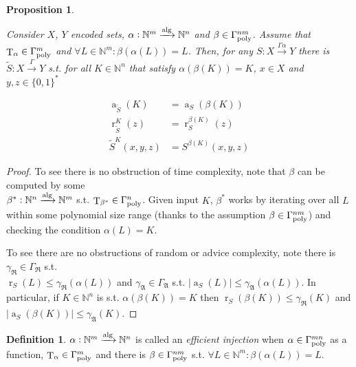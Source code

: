 \documentclass{article}
\numberwithin{equation}{section}
\theoremstyle{definition}
\newtheorem{definition}{Definition}[section]
\theoremstyle{plain}
\newtheorem{proposition}{Proposition}[section]
\newcommand{\Bool}{\{0,1\}}
\newcommand{\Words}{{\Bool^*}}
\DeclareMathOperator{\T}{T}
\DeclareMathOperator{\R}{r}
\DeclareMathOperator{\A}{a}
\newcommand{\Nats}{\mathbb{N}}
\newcommand{\Abs}[1]{\lvert #1 \rvert}
\newcommand{\GrowR}{\Gamma_{\mathfrak{R}}}
\newcommand{\GrowA}{\Gamma_{\mathfrak{A}}}
\newcommand{\GammaPoly}{\Gamma_{\textnormal{poly}}}
\newcommand{\Alg}{\xrightarrow{\textnormal{alg}}}
\newcommand{\Scheme}{\xrightarrow{\Gamma}}
\begin{document}
\begin{samepage}
\begin{proposition}
\label{prp:rev_sch_idx}

Consider  ${X}$, ${Y}$ encoded sets, ${\alpha: \Nats^m \Alg \Nats^n}$ and ${\beta \in \GammaPoly^{nm}}$. Assume that ${\T_\alpha \in \GammaPoly^m}$ and ${\forall L \in \Nats^m: \beta(\alpha(L))=L}$. Then, for any  ${S: X \xrightarrow{\Gamma \alpha} Y}$ there is ${\tilde{S}: X \Scheme Y}$ s.t. for all ${K \in \Nats^n}$ that satisfy ${\alpha(\beta(K))=K}$, ${x \in X}$ and ${y,z \in \Words}$

\begin{align}
\A_{\tilde{S}}(K)&=\A_S(\beta(K)) \\
\R_{\tilde{S}}^K(z)&=\R_S^{\beta(K)}(z) \\
\tilde{S}^K(x,y,z)&=S^{\beta(K)}(x,y,z)
\end{align}

\end{proposition}
\end{samepage}

\begin{proof}

To see there is no obstruction of time complexity, note that ${\beta}$ can be computed by some\\ ${\beta^*: \Nats^n \Alg \Nats^m}$ s.t. ${\T_{\beta^*} \in \GammaPoly^n}$. Given input ${K}$, ${\beta^*}$ works by iterating over all ${L}$ within some polynomial size range (thanks to the assumption ${\beta \in \GammaPoly^{nm}}$) and checking the condition ${\alpha(L)=K}$.

To see there are no obstructions of random or advice complexity, note there is ${\gamma_{\mathfrak{R}} \in \GrowR}$ s.t.\\ $\R_S(L) \leq \gamma_{\mathfrak{R}}(\alpha(L))$ and ${\gamma_{\mathfrak{A}} \in \GrowA}$ s.t. ${\Abs{\A_S(L)} \leq \gamma_{\mathfrak{A}}(\alpha(L))}$. In particular, if ${K \in \Nats^n}$ is s.t. ${\alpha(\beta(K))=K}$ then ${\R_S(\beta(K)) \leq \gamma_{\mathfrak{R}}(K)}$ and ${\Abs{\A_S(\beta(K))} \leq \gamma_{\mathfrak{A}}(K)}$.
%
\end{proof}

\begin{samepage}
\begin{definition}

${\alpha: \Nats^m \Alg \Nats^n}$ is called an \emph{efficient injection} when ${\alpha \in \GammaPoly^{mn}}$ as a function, ${\T_\alpha \in \GammaPoly^m}$ and there is ${\beta \in \GammaPoly^{nm}}$ s.t. ${\forall L \in \Nats^m: \beta(\alpha(L))=L}$.

\end{definition}
\end{samepage}
\end{document}
